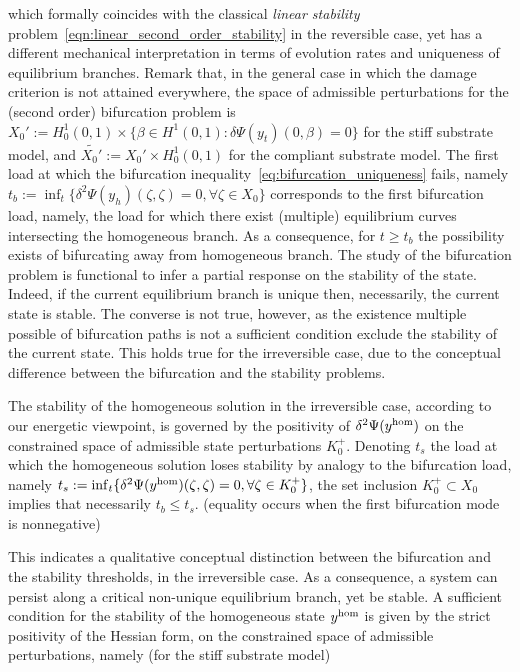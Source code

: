 which formally coincides with the classical \emph{linear stability} problem~\eqref{eqn:linear_second_order_stability} in the reversible case, yet has a different mechanical interpretation in terms of evolution rates and uniqueness of equilibrium branches.
Remark that, in the general case in which the damage criterion is not attained everywhere, the space of admissible perturbations for the (second order) bifurcation problem is $X_0':=H^1_0(0, 1) \times \{ \beta \in H^1(0, 1) : \delta\Psi(y_t)(0, \beta) = 0 \}$ for the stiff substrate model, and $\widetilde{X_0'}:=X_0'\times H^1_0(0,1)$ for the compliant substrate model. 
The first load at which the bifurcation inequality~\eqref{eq:bifurcation_uniqueness} fails, namely $t_b:=\inf_t \{\delta^2 \Psi(y_h)(\zeta, \zeta) =0, \forall \zeta \in X_0 \}$ corresponds to the first  bifurcation load, namely, the load for which there exist (multiple) equilibrium curves intersecting the homogeneous branch. As a consequence, for $t\geq t_b$  the possibility exists of bifurcating away from homogeneous branch. The study of the bifurcation problem is functional to infer a partial response on the stability of the state. Indeed, if the current equilibrium branch is unique then, necessarily, the current state is stable. The converse is not true, however, as the existence multiple possible of bifurcation paths is not a sufficient condition exclude the stability of the current state. This holds true for the irreversible case, due to the conceptual difference between the bifurcation and the stability problems.

The stability of the homogeneous solution in the irreversible case, according to our energetic viewpoint, is governed by the positivity of $\delta^2 \Psi(y^{\text{hom}})$ on the constrained space of admissible state perturbations $K^+_0$.
Denoting $t_s$ the load at which the homogeneous solution loses stability by analogy to the bifurcation load, namely $t_s: = \inf_t \{\delta^2 \Psi(y^{\text{hom}})(\zeta, \zeta) =0, \forall \zeta \in K^+_0 \}$, the set inclusion $K^+_0 \subset X_0$ implies that necessarily $t_b \leq t_s$. (equality occurs when the first bifurcation mode is nonnegative)

This indicates a qualitative conceptual distinction between the bifurcation and the stability thresholds, in the irreversible case. As a consequence, a system can persist along a critical non-unique equilibrium branch, yet be stable. 
A sufficient condition for the stability of the homogeneous state $y^{\text{hom}}$ is given by the strict positivity  of the Hessian form, on the constrained space of admissible perturbations, namely (for the stiff substrate model)

